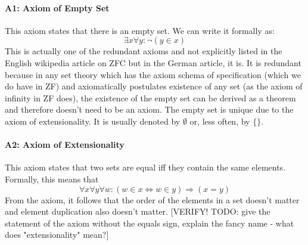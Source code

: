 


\paragraph{A1: Axiom of Empty Set}
This axiom states that there is an empty set. We can write it formally as:
\begin{equation}
\exists x \forall y: \neg (y \in x)
\end{equation}
This is actually one of the redundant axioms and not explicitly listed in the English wikipedia article on ZFC but in the German article, it is. It is redundant because in any set theory which has the axiom schema of specification (which we do have in ZF) and axiomatically postulates existence of any set (as the axiom of infinity in ZF does), the existence of the empty set can be derived as a theorem and therefore doesn't need to be an axiom. The empty set is unique due to the axiom of extensionality. It is usually denoted by $\emptyset$ or, less often, by $\{ \}$.



\paragraph{A2: Axiom of Extensionality}
This axiom states that two sets are equal iff they contain the same elements. Formally, this means that
\begin{equation}
\forall x \forall y \forall w: 
(w \in x \Leftrightarrow w \in y) \Rightarrow (x = y)
\end{equation}
From the axiom, it follows that the order of the elements in a set doesn't matter and element duplication also doesn't matter. [VERIFY! TODO: give the statement of the axiom without the equals sign, explain the fancy name - what does "extensionality" mean?]

